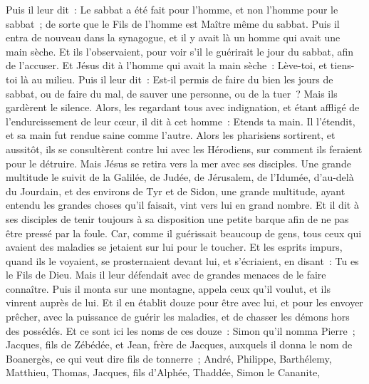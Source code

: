 \begin{multicols}{2}
Puis il leur dit~: Le sabbat a été fait pour l'homme, et non l'homme pour le sabbat~;
de sorte que le Fils de l'homme est Maître même du sabbat.
\VerseOne{}Puis il entra de nouveau dans la synagogue, et il y avait là un homme qui avait une main sèche.
Et ils l'observaient, pour voir s'il le guérirait le jour du sabbat, afin de l'accuser.
Et Jésus dit à l'homme qui avait la main sèche~: Lève-toi, et tiens-toi là au milieu.
Puis il leur dit~: Est-il permis de faire du bien les jours de sabbat, ou de faire du mal, de sauver une personne, ou de la tuer~? Mais ils gardèrent le silence.
Alors, les regardant tous avec indignation, et étant affligé de l'endurcissement de leur cœur, il dit à cet homme~: Etends ta main. Il l'étendit, et sa main fut rendue saine comme l'autre.
Alors les pharisiens sortirent, et aussitôt, ils se consultèrent contre lui avec les Hérodiens, sur comment ils feraient pour le détruire.
Mais Jésus se retira vers la mer avec ses disciples. Une grande multitude le suivit de la Galilée,
de Judée, de Jérusalem, de l'Idumée, d'au-delà du Jourdain, et des environs de Tyr et de Sidon, une grande multitude, ayant entendu les grandes choses qu'il faisait, vint vers lui en grand nombre.
Et il dit à ses disciples de tenir toujours à sa disposition une petite barque afin de ne pas être pressé par la foule.
Car, comme il guérissait beaucoup de gens, tous ceux qui avaient des maladies se jetaient sur lui pour le toucher.
Et les esprits impurs, quand ils le voyaient, se prosternaient devant lui, et s'écriaient, en disant~: Tu es le Fils de Dieu.
Mais il leur défendait avec de grandes menaces de le faire connaître.
Puis il monta sur une montagne, appela ceux qu'il voulut, et ils vinrent auprès de lui.
Et il en établit douze pour être avec lui,
et pour les envoyer prêcher, avec la puissance de guérir les maladies, et de chasser les démons hors des possédés.
Et ce sont ici les noms de ces douze~: Simon qu'il nomma Pierre~;
Jacques, fils de Zébédée, et Jean, frère de Jacques, auxquels il donna le nom de Boanergès, ce qui veut dire fils de tonnerre~;
André, Philippe, Barthélemy, Matthieu, Thomas, Jacques, fils d'Alphée, Thaddée, Simon le Cananite,

\end{multicols}
